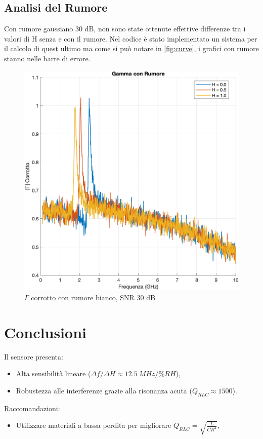 \documentclass[conference]{IEEEtran}
\begin{document}
\subsection{Analisi del Rumore}
Con rumore gaussiano 30 dB, non sono state ottenute effettive differenze tra i valori di H senza e con il rumore. Nel codice è stato implementato un sistema per il calcolo di quest ultimo ma come si può notare in \autoref{fig:curve}, i grafici con rumore stanno nelle barre di errore.
\begin{figure}[!ht]
    \centering
    \includegraphics[width=\linewidth]{img/rumore.png}
    \caption{$\Gamma $ corrotto con rumore bianco, SNR 30 dB}
    \label{fig:rumore}
\end{figure}
\section{Conclusioni}
Il sensore presenta:
\begin{itemize}
    \item Alta sensibilità  lineare (\(\Delta f/\Delta H \approx \SI{12.5}{MHz/\%RH}\)),
    
    \item Robustezza alle interferenze grazie alla risonanza acuta (\(Q_{RLC} \approx 1500\)).
\end{itemize}
Raccomandazioni:
\begin{itemize}
    \item Utilizzare materiali a bassa perdita per migliorare \(Q_{RLC} = \sqrt{\frac{L}{CR^2}}\),
    
\end{itemize}
\end{document}
